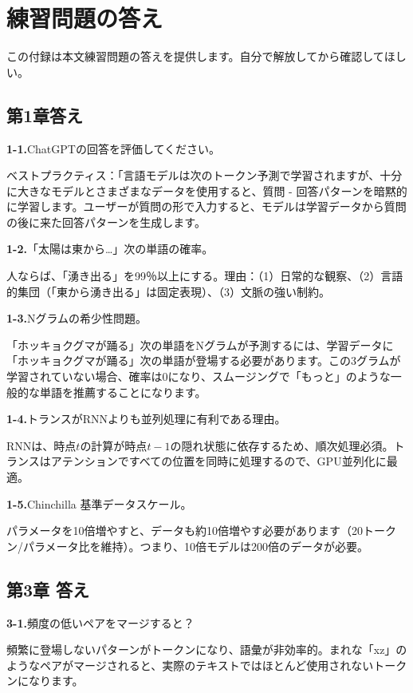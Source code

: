 \chapter{練習問題の答え}
\label{app:answers}

この付録は本文練習問題の答えを提供します。自分で解放してから確認してほしい。

\section{第1章答え}

\textbf{1-1.}ChatGPTの回答を評価してください。

ベストプラクティス：「言語モデルは次のトークン予測で学習されますが、十分に大きなモデルとさまざまなデータを使用すると、質問 - 回答パターンを暗黙的に学習します。ユーザーが質問の形で入力すると、モデルは学習データから質問の後に来た回答パターンを生成します。

\textbf{1-2.}「太陽は東から…」次の単語の確率。

人ならば、「湧き出る」を99％以上にする。理由：（1）日常的な観察、（2）言語的集団（「東から湧き出る」は固定表現）、（3）文脈の強い制約。

\textbf{1-3.}Nグラムの希少性問題。

「ホッキョクグマが踊る」次の単語をNグラムが予測するには、学習データに「ホッキョクグマが踊る」次の単語が登場する必要があります。この3グラムが学習されていない場合、確率は0になり、スムージングで「もっと」のような一般的な単語を推薦することになります。

\textbf{1-4.}トランスがRNNよりも並列処理に有利である理由。

RNNは、時点$t$の計算が時点$t-1$の隠れ状態に依存するため、順次処理必須。トランスはアテンションですべての位置を同時に処理するので、GPU並列化に最適。

\textbf{1-5.}Chinchilla 基準データスケール。

パラメータを10倍増やすと、データも約10倍増やす必要があります（20トークン/パラメータ比を維持）。つまり、10倍モデルは200倍のデータが必要。

\section{第3章 答え}

\textbf{3-1.}頻度の低いペアをマージすると？

頻繁に登場しないパターンがトークンになり、語彙が非効率的。まれな「xz」のようなペアがマージされると、実際のテキストではほとんど使用されないトークンになります。


